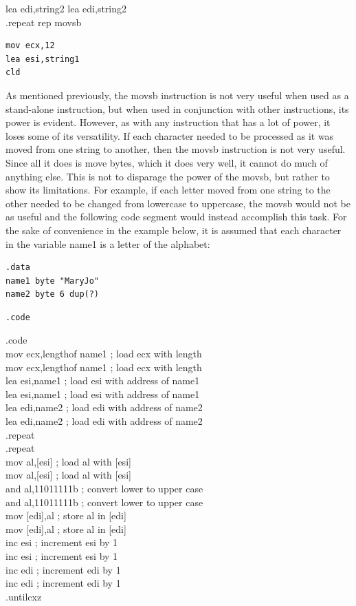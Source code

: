 \documentclass[10pt]{book}
\begin{document}
\begin{center}
\begin{center}
\begin{center}
lea edi,string2 lea edi,string2\\
.repeat rep movsb

\begin{verbatim}
mov ecx,12
lea esi,string1
cld
\end{verbatim}

As mentioned previously, the movsb instruction is not very useful when used as a stand-alone instruction, but when used in conjunction with other instructions, its power is evident. However, as with any instruction that has a lot of power, it loses some of its versatility. If each character needed to be processed as it was moved from one string to another, then the movsb instruction is not very useful. Since all it does is move bytes, which it does very well, it cannot do much of anything else. This is not to disparage the power of the movsb, but rather to show its limitations. For example, if each letter moved from one string to the other needed to be changed from lowercase to uppercase, the movsb would not be as useful and the following code segment would instead accomplish this task. For the sake of convenience in the example below, it is assumed that each character in the variable name1 is a letter of the alphabet:

\begin{verbatim}
.data
name1 byte "MaryJo"
name2 byte 6 dup(?)
\end{verbatim}

\begin{verbatim}
.code
\end{verbatim}

.code\\
mov ecx,lengthof name1 ; load ecx with length\\

mov ecx,lengthof name1 ; load ecx with length\\
lea esi,name1 ; load esi with address of name1\\
lea esi,name1 ; load esi with address of name1\\
lea edi,name2 ; load edi with address of name2\\
lea edi,name2 ; load edi with address of name2\\
.repeat\\
.repeat\\[0pt]
mov al,[esi] ; load al with [esi]\\[0pt]
mov al,[esi] ; load al with [esi]\\
and al,11011111b ; convert lower to upper case\\
and al,11011111b ; convert lower to upper case\\[0pt]
mov [edi],al ; store al in [edi]\\[0pt]
mov [edi],al ; store al in [edi]\\
inc esi ; increment esi by 1\\
inc esi ; increment esi by 1\\
inc edi ; increment edi by 1\\
inc edi ; increment edi by 1\\
.untilcxz


\end{center}
\end{center}
\end{center}
\end{document}
